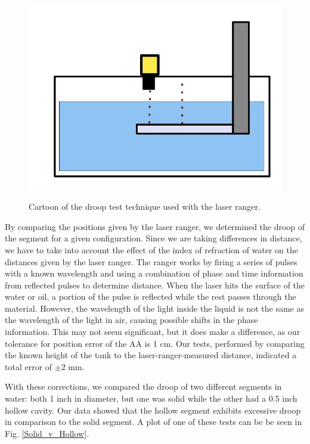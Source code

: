 \begin{figure}
\caption{Cartoon of the droop test technique used with the laser ranger.}
\includegraphics[width=\textwidth]{AA/Droop_Liquid_Test.jpg}
\label{Droop_Water}
\end{figure}

By comparing the positions given by the laser ranger, we determined the droop of the segment for a given configuration.  Since we are taking differences in distance, we have to take into account the effect of the index of refraction of water on the distances given by the laser ranger. The ranger works by firing a series of pulses with a known wavelength and using a combination of phase and time information from reflected pulses to determine distance. When the laser hits the surface of the water or oil, a portion of the pulse is reflected while the rest passes through the material. However, the wavelength of the light inside the liquid is not the same as the wavelength of the light in air, causing possible shifts in the phase information. This may not seem significant, but it does make a difference, as our tolerance for position error of the AA is 1 cm. Our tests, performed by comparing the known height of the tank to the laser-ranger-measured distance, indicated a total error of $\pm2$ mm.  

With these corrections, we compared the droop of two different segments in water: both 1 inch in diameter, but one was solid while the other had a 0.5 inch hollow cavity. Our data showed that the hollow segment exhibits excessive droop in comparison to the solid segment. A plot of one of these tests can be be seen in Fig. \ref{Solid_v_Hollow}.

